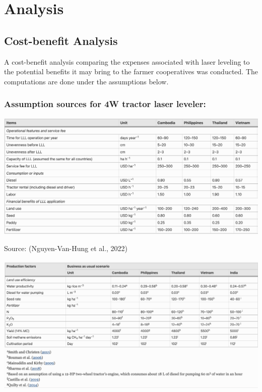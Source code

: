 \documentclass[
]{article}
\begin{document}
\hypertarget{analysis}{%
\section{Analysis}\label{analysis}}

\hypertarget{cost-benefit-analysis}{%
\subsection{Cost-benefit Analysis}\label{cost-benefit-analysis}}

A cost-benefit analysis comparing the expenses associated with laser
leveling to the potential benefits it may bring to the farmer
cooperatives was conducted. The computations are done under the
assumptions below.

\hypertarget{assumption-sources-for-4w-tractor-laser-leveler}{%
\subsubsection{Assumption sources for 4W tractor laser
leveler:}\label{assumption-sources-for-4w-tractor-laser-leveler}}

\includegraphics{images/Screenshot 2023-06-12 at 9.42.22 PM.png}

Source: (Nguyen-Van-Hung et al., 2022)

\includegraphics{images/Screenshot 2023-06-12 at 10.52.03 PM.png}
\end{document}
